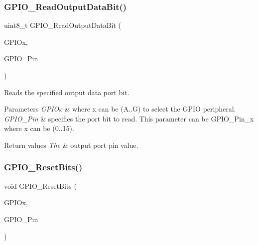\subsubsection{\texorpdfstring{GPIO\_ReadOutputDataBit()}{GPIO\_ReadOutputDataBit()}}
{\footnotesize\ttfamily uint8\+\_\+t G\+P\+I\+O\+\_\+\+Read\+Output\+Data\+Bit (\begin{DoxyParamCaption}\item[{\mbox{\hyperlink{struct_g_p_i_o___type_def}{G\+P\+I\+O\+\_\+\+Type\+Def}} $\ast$}]{G\+P\+I\+Ox,  }\item[{uint16\+\_\+t}]{G\+P\+I\+O\+\_\+\+Pin }\end{DoxyParamCaption})}



Reads the specified output data port bit. 


\begin{DoxyParams}{Parameters}
{\em G\+P\+I\+Ox} & where x can be (A..G) to select the G\+P\+IO peripheral. \\
\hline
{\em G\+P\+I\+O\+\_\+\+Pin} & specifies the port bit to read. This parameter can be G\+P\+I\+O\+\_\+\+Pin\+\_\+x where x can be (0..15). \\
\hline
\end{DoxyParams}

\begin{DoxyRetVals}{Return values}
{\em The} & output port pin value. \\
\hline
\end{DoxyRetVals}
\mbox{\label{group___g_p_i_o___exported___functions_ga6fcd35b207a66608dd2c9d7de9247dc8}} 
\subsubsection{\texorpdfstring{GPIO\_ResetBits()}{GPIO\_ResetBits()}}
{\footnotesize\ttfamily void G\+P\+I\+O\+\_\+\+Reset\+Bits (\begin{DoxyParamCaption}\item[{\mbox{\hyperlink{struct_g_p_i_o___type_def}{G\+P\+I\+O\+\_\+\+Type\+Def}} $\ast$}]{G\+P\+I\+Ox,  }\item[{uint16\+\_\+t}]{G\+P\+I\+O\+\_\+\+Pin }\end{DoxyParamCaption})}



